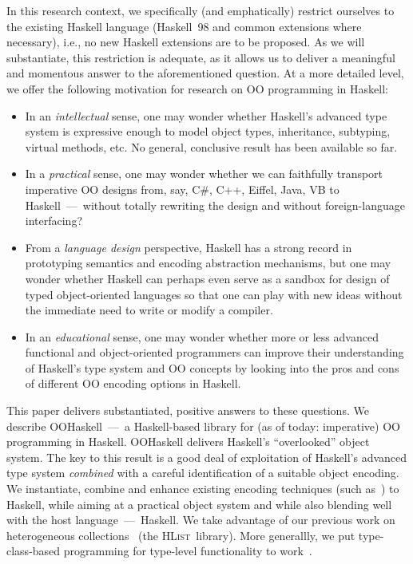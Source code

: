 \documentclass{jfp}
\newcommand{\HList}{\textsc{HList}}
\begin{document}
\noindent
In this research context, we specifically (and emphatically) restrict
ourselves to the existing Haskell language (Haskell~98 and common
extensions where necessary), i.e., no new Haskell extensions are to be
proposed. As we will substantiate, this restriction is adequate, as it
allows us to deliver a meaningful and momentous answer to the
aforementioned question. At a more detailed level, we offer the
following motivation for research on OO programming in Haskell:
%
\begin{itemize}

\item
In an \emph{intellectual} sense, one may wonder whether Haskell's
advanced type system is expressive enough to model object types,
inheritance, subtyping, virtual methods, etc. No general, conclusive
result has been available so far.

\smallskip

\item
In a \emph{practical} sense, one may wonder whether we can faithfully
transport imperative OO designs from, say, C\#, C++, Eiffel, Java, VB
to Haskell~---~without totally rewriting the design and without
foreign-language interfacing?

\smallskip

\item From a \emph{language design} perspective, Haskell has a strong
record in prototyping semantics and encoding abstraction mechanisms,
but one may wonder whether Haskell can perhaps even serve as a sandbox
for design of typed object-oriented languages so that one can play
with new ideas without the immediate need to write or modify a
compiler.

\smallskip

\item In an \emph{educational} sense, one may wonder whether
more or less advanced functional and object-oriented programmers can
improve their understanding of Haskell's type system and OO concepts
by looking into the pros and cons of different OO encoding options in
Haskell.

\end{itemize}

\smallskip

This paper delivers substantiated, positive answers to these
questions. We describe OOHaskell~---~a Haskell-based library for (as
of today: imperative) OO programming in Haskell. OOHaskell delivers
Haskell's ``overlooked'' object system. The key to this result is a
good deal of exploitation of Haskell's advanced type system
\emph{combined} with a careful identification of a suitable object
encoding. We instantiate, combine and enhance existing encoding
techniques (such as~\cite{PT94,ML-ART,AC96}) to Haskell, while aiming
at a practical object system and while also blending well with the
host language~---~Haskell. We take advantage of our previous work on
heterogeneous collections~\cite{HLIST-HW04} (the \HList\ library).
More generallly, we put type-class-based programming for type-level
functionality to work~\cite{Hallgren01,Fake,NTGS02,NTGS01}.
\end{document}
